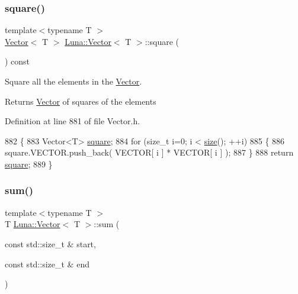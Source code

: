 \subsubsection{\texorpdfstring{square()}{square()}}
{\footnotesize\ttfamily template$<$typename T $>$ \\
\hyperlink{classLuna_1_1Vector}{Vector}$<$ T $>$ \hyperlink{classLuna_1_1Vector}{Luna\+::\+Vector}$<$ T $>$\+::square (\begin{DoxyParamCaption}{ }\end{DoxyParamCaption}) const\hspace{0.3cm}{\ttfamily [inline]}}



Square all the elements in the \hyperlink{classLuna_1_1Vector}{Vector}. 

\begin{DoxyReturn}{Returns}
\hyperlink{classLuna_1_1Vector}{Vector} of squares of the elements 
\end{DoxyReturn}


Definition at line 881 of file Vector.\+h.


\begin{DoxyCode}
882   \{
883     Vector<T> \hyperlink{classLuna_1_1Vector_a60f8017f50e602151c84686ac081af66}{square};
884     \textcolor{keywordflow}{for} (\textcolor{keywordtype}{size\_t} i=0; i < \hyperlink{classLuna_1_1Vector_ac9b6ed7a0df401728f27c193fbc8f4d8}{size}(); ++i)
885     \{
886       square.VECTOR.push\_back( VECTOR[ i ] * VECTOR[ i ] );
887     \}
888     \textcolor{keywordflow}{return} \hyperlink{classLuna_1_1Vector_a60f8017f50e602151c84686ac081af66}{square};
889   \}
\end{DoxyCode}
\mbox{\label{classLuna_1_1Vector_a2d8df886780b81d237c11fda4c310cab}} 
\subsubsection{\texorpdfstring{sum()}{sum()}\hspace{0.1cm}{\footnotesize\ttfamily [1/2]}}
{\footnotesize\ttfamily template$<$typename T $>$ \\
T \hyperlink{classLuna_1_1Vector}{Luna\+::\+Vector}$<$ T $>$\+::sum (\begin{DoxyParamCaption}\item[{const std\+::size\+\_\+t \&}]{start,  }\item[{const std\+::size\+\_\+t \&}]{end }\end{DoxyParamCaption})\hspace{0.3cm}{\ttfamily [inline]}}



